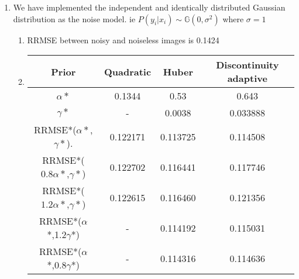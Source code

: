 \documentclass[11pt]{article}
\begin{document}
\begin{enumerate}
    \item 
    We have implemented the independent and identically distributed Gaussian distribution as the noise model. ie $P(y_i | x_i) \sim \mathbb{G}(0, \sigma^2)$ where $\sigma=1$
    \begin{enumerate}
        \item RRMSE between noisy and noiseless images is 0.1424
        \item 
         \begin{tabular}{|c|c|c|c|}
            \hline
             Prior & Quadratic & Huber & Discontinuity adaptive  \\
             \hline
             $\alpha*$ & 0.1344 &0.53 &0.643\\
             \hline
             $\gamma*$ & - & 0.0038 &0.033888\\
             \hline
            RRMSE*($\alpha*$,$\gamma*$).  & 0.122171 & 0.113725 & 0.114508\\
            \hline
             RRMSE*($0.8\alpha*$,$\gamma*$) & 0.122702 & 0.116441 & 0.117746\\
            \hline
             RRMSE*($1.2\alpha*$,$\gamma*$) & 0.122615 & 0.116460 & 0.121356\\
            \hline
            RRMSE*($\alpha$*,1.2$\gamma$*) & - & 0.114192 & 0.115031\\
            \hline
             RRMSE*($\alpha$*,0.8$\gamma$*) & - & 0.114316  & 0.114636\\
             \hline
        \end{tabular}
        
        
            

\end{enumerate}
\end{enumerate}
\end{document}
